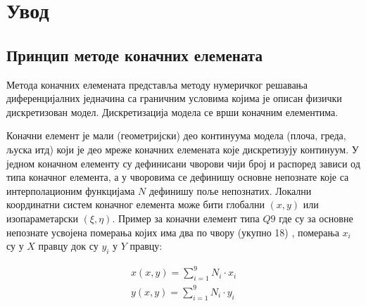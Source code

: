 \documentclass[11pt, a4paper]{article}
\begin{document}
\section{Увод}
\subsection{Принцип методе коначних елемената} 
Метода коначних елемената представља методу нумеричког решавања диференцијалних једначина са граничним условима којима је описан физички дискретизован модел. Дискретизација модела се врши коначним елементима.
\par
Коначни елемент је мали (геометријски) део континуума модела (плоча, греда, љуска итд) који је део мреже коначних елемената које дискретизују континуум. У једном коначном елементу су дефинисани чворови чији број и распоред зависи од типа коначног елемента, а у чворовима се дефинишу основне непознате које са интерполационим функцијама $N$ дефинишу поље непознатих.  Локални координатни систем коначног елемента може бити глобални $(x,y)$ или изопараметарски $(\xi, \eta)$. Пример за коначни елемент типа $Q9$  где су за основне непознате усвојена померања којих има два по чвору (укупно 18) , померања $x_i$ су у $X$ правцу док су $y_i$ у $Y$ правцу:

\begin{eqnarray}
	x(x,y) = \sum_{i=1}^9N_i \cdot x_i \\
	y(x,y) = \sum_{i=1}^9N_i \cdot y_i 
\end{eqnarray}
\end{document}

